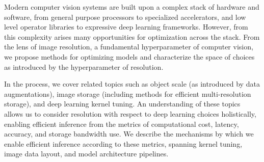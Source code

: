 Modern computer vision systems are built upon a complex stack of hardware and software, from general purpose processors to specialized accelerators, and low level operator libraries to expressive deep learning frameworks.
However, from this complexity arises many opportunities for optimization across the stack.
From the lens of image resolution, a fundamental hyperparameter of computer vision, we propose methods for optimizing models and characterize the space of choices as introduced by the hyperparameter of resolution.

In the process, we cover related topics such as object scale (as introduced by data augmentations), image storage (including methods for efficient multi-resolution storage), and deep learning kernel tuning.
An understanding of these topics allows us to consider resolution with respect to deep learning choices holistically, enabling efficient inference from the metrics of computational cost, latency, accuracy, and storage bandwidth use.
We describe the mechanisms by which we enable efficient inference according to these metrics, spanning kernel tuning, image data layout, and model architecture pipelines.
